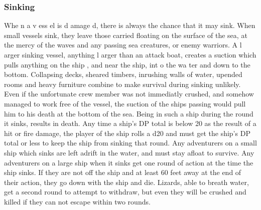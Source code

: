 \begin{multicols*}{2}
\subsubsection{Sinking}
Whe n a v ess el is d amage d, there is always the
chance that it may sink. When small vessels sink, they leave
those carried floating on the surface of the sea, at the mercy of
the waves and any passing sea creatures, or enemy warriors.
A l arger sinking vessel, anything l arger than an
attack boat, creates a suction which pulls anything on the
ship , and near the ship, int o the wa ter and down to the
bottom. Collapsing decks, sheared timbers, inrushing walls of
water, upended rooms and heavy furniture combine to make
survival during sinking unlikely. Even if the unfortunate crew
member was not immediatly crushed, and somehow managed
to work free of the vessel, the suction of the ships passing
would pull him to his death at the bottom of the sea. Being in
such a ship during the round it sinks, results in death.
Any time a ship’s DP total is below 20 as the result
of a hit or fire damage, the player of the ship rolls a d20 and
must get the ship’s DP total or less to keep the ship from
sinking that round. Any adventurers on a small ship which
sinks are left adrift in the water, and must stay afloat to
survive.
Any adventurers on a large ship when it sinks get
one round of action at the time the ship sinks. If they are not
off the ship and at least 60 feet away at the end of their action,
they go down with the ship and die. Lizards, able to breath
water, get a second round to attempt to withdraw, but even
they will be crushed and killed if they can not escape within
two rounds.
\end{multicols*}